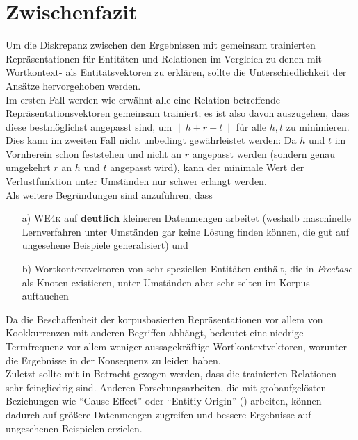 \section{Zwischenfazit}\label{sec:we4k-zwifa}

Um die Diskrepanz zwischen den Ergebnissen mit gemeinsam trainierten Repräsentationen für Entitäten und Relationen im Vergleich
zu denen mit Wortkontext- als Entitätsvektoren zu erklären, sollte die Unterschiedlichkeit der Ansätze hervorgehoben
werden.\\

Im ersten Fall werden wie erwähnt alle eine Relation betreffende Repräsentationsvektoren gemeinsam trainiert; es ist
also davon auszugehen, dass diese bestmöglichst angepasst sind, um $\parallel h + r - t\parallel$ für alle $h, t$ zu minimieren.\\
Dies kann im zweiten Fall nicht unbedingt gewährleistet werden: Da $h$ und $t$ im Vornherein schon feststehen und nicht
an $r$ angepasst werden (sondern genau umgekehrt $r$ an $h$ und $t$ angepasst wird), kann der minimale Wert der Verlustfunktion
unter Umständen nur schwer erlangt werden.\\
Als weitere Begründungen sind anzuführen, dass
\begin{itemize}
 \item[a)] \textsc{WE4k} auf \textbf{deutlich} kleineren Datenmengen arbeitet (weshalb maschinelle
  Lernverfahren unter Umständen gar keine Lösung finden können, die gut auf ungesehene Beispiele generalisiert) und
  \item[b)] Wortkontextvektoren von sehr speziellen Entitäten enthält, die in \emph{Freebase} als Knoten existieren,
  unter Umständen aber sehr selten im Korpus auftauchen
\end{itemize}
Da die Beschaffenheit der korpusbasierten Repräsentationen vor allem von Kookkurrenzen mit anderen
Begriffen abhängt, bedeutet eine niedrige Termfrequenz vor allem weniger aussagekräftige Wortkontextvektoren, worunter die
Ergebnisse in der Konsequenz zu leiden haben.\\

Zuletzt sollte mit in Betracht gezogen werden, dass die trainierten Relationen sehr feingliedrig sind. Anderen Forschungsarbeiten,
 die mit grobaufgelösten Beziehungen wie ``Cause-Effect'' oder ``Entitiy-Origin''
(\cite{hendrickx2009semeval}) arbeiten, können dadurch auf größere Datenmengen zugreifen und bessere Ergebnisse auf
ungesehenen Beispielen erzielen.
